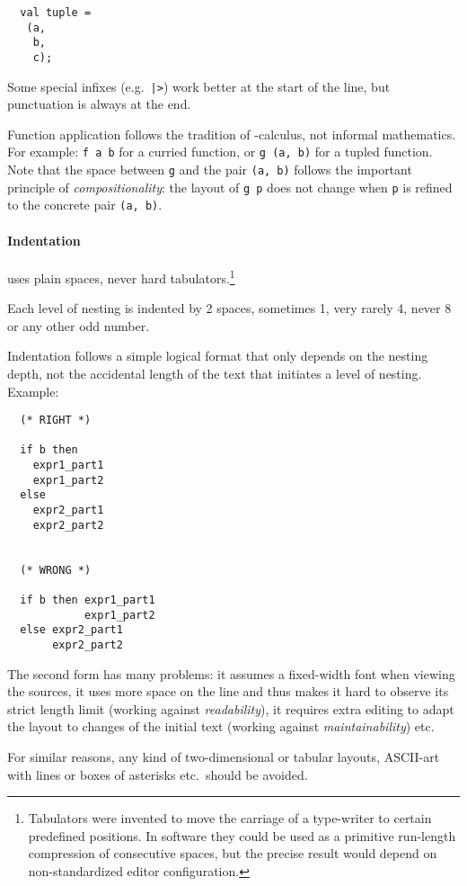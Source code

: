 \begin{isabellebody}
\begin{isamarkuptext}
\begin{verbatim}
  val tuple =
   (a,
    b,
    c);
  \end{verbatim}

  Some special infixes (e.g.\ \verb||\verb,|,\verb|>|) work better at the
  start of the line, but punctuation is always at the end.

  Function application follows the tradition of \isa{{\isasymlambda}}-calculus,
  not informal mathematics.  For example: \verb|f a b| for a
  curried function, or \verb|g (a, b)| for a tupled function.
  Note that the space between \verb|g| and the pair \verb|(a, b)| follows the important principle of
  \emph{compositionality}: the layout of \verb|g p| does not
  change when \verb|p| is refined to the concrete pair
  \verb|(a, b)|.

  \paragraph{Indentation} uses plain spaces, never hard
  tabulators.\footnote{Tabulators were invented to move the carriage
  of a type-writer to certain predefined positions.  In software they
  could be used as a primitive run-length compression of consecutive
  spaces, but the precise result would depend on non-standardized
  editor configuration.}

  Each level of nesting is indented by 2 spaces, sometimes 1, very
  rarely 4, never 8 or any other odd number.

  Indentation follows a simple logical format that only depends on the
  nesting depth, not the accidental length of the text that initiates
  a level of nesting.  Example:

  \begin{verbatim}
  (* RIGHT *)

  if b then
    expr1_part1
    expr1_part2
  else
    expr2_part1
    expr2_part2


  (* WRONG *)

  if b then expr1_part1
            expr1_part2
  else expr2_part1
       expr2_part2
  \end{verbatim}

  The second form has many problems: it assumes a fixed-width font
  when viewing the sources, it uses more space on the line and thus
  makes it hard to observe its strict length limit (working against
  \emph{readability}), it requires extra editing to adapt the layout
  to changes of the initial text (working against
  \emph{maintainability}) etc.

  \medskip For similar reasons, any kind of two-dimensional or tabular
  layouts, ASCII-art with lines or boxes of asterisks etc.\ should be
  avoided.


\end{isamarkuptext}
\end{isabellebody}
